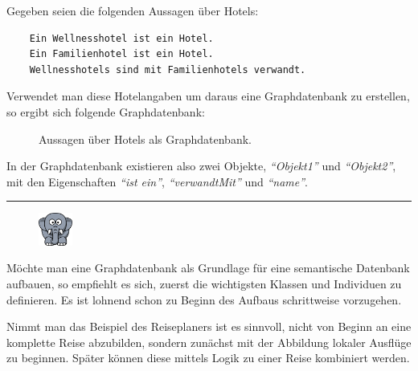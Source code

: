 \newpage

Gegeben seien die folgenden Aussagen über Hotels:
\begin{lstlisting}
    Ein Wellnesshotel ist ein Hotel.
    Ein Familienhotel ist ein Hotel.
    Wellnesshotels sind mit Familienhotels verwandt.
\end{lstlisting}

Verwendet man diese Hotelangaben um daraus eine Graphdatenbank zu erstellen, so ergibt sich folgende Graphdatenbank:
\begin{figure}[htbp]
\centering {}
\caption{Aussagen über Hotels als Graphdatenbank.\label{fig:hotels_graphdatenbank}\protect\footnotemark}
\end{figure}

In der Graphdatenbank existieren also zwei Objekte, \textit{``Objekt1''} und \textit{``Objekt2''}, mit den Eigenschaften \textit{``ist ein''}, \textit{``verwandtMit''} und \textit{``name''}.

\newpage

\noindent\rule[1ex]{\textwidth}{1pt}
\begin{figure}
    \vspace{-12pt}
    \includegraphics[width=0.1\textwidth]{bilder/elephant.png}
\end{figure}
\label{elephant_graph_data}
Möchte man eine Graphdatenbank als Grundlage für eine semantische Datenbank aufbauen, so empfiehlt es sich, zuerst die wichtigsten Klassen und Individuen zu definieren. Es ist lohnend schon zu Beginn des Aufbaus schrittweise vorzugehen.

Nimmt man das Beispiel des Reiseplaners ist es sinnvoll, nicht von Beginn an eine komplette Reise abzubilden, sondern zunächst mit der Abbildung lokaler Ausflüge zu beginnen. Später können diese mittels Logik zu einer Reise kombiniert werden.

